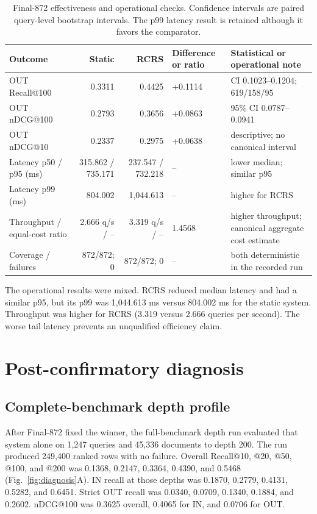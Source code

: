 \documentclass[final,5p,times,twocolumn]{elsarticle}
\newcommand{\RCRS}{RCRS}
\newenvironment{widejournal}{\begin{table}[!t]}{\end{table}}
\newenvironment{widejournal}{\begin{table}[!htbp]}{\end{table}}
\begin{document}
\begin{widejournal}
\caption{Final-872 effectiveness and operational checks. Confidence intervals
are paired query-level bootstrap intervals. The p99 latency result is retained
although it favors the comparator.}
\label{tab:final}
\centering
\scriptsize
\renewcommand{\arraystretch}{0.90}
\begin{tabularx}{\textwidth}{@{}P{2.4cm}r r P{1.5cm}Y@{}}
\toprule
Outcome & Static & \RCRS{} & Difference or ratio & Statistical or operational note \\
\midrule
OUT Recall@100 & 0.3311 & 0.4425 & +0.1114 &
CI 0.1023--0.1204; 619/158/95 \\
OUT nDCG@100 & 0.2793 & 0.3656 & +0.0863 &
95\% CI 0.0787--0.0941 \\
OUT nDCG@10 & 0.2337 & 0.2975 & +0.0638 &
descriptive; no canonical interval \\
Latency p50 / p95 (ms) & 315.862 / 735.171 & 237.547 / 732.218 & -- &
lower median; similar p95 \\
Latency p99 (ms) & 804.002 & 1,044.613 & -- & higher for \RCRS{} \\
Throughput / equal-cost ratio & 2.666 q/s / -- & 3.319 q/s / -- & 1.4568 &
higher throughput; canonical aggregate cost estimate \\
Coverage / failures & 872/872; 0 & 872/872; 0 & -- &
both deterministic in the recorded run \\
\bottomrule
\end{tabularx}
\end{widejournal}

The operational results were mixed. \RCRS{} reduced median latency and had a
similar p95, but its p99 was 1,044.613 ms versus 804.002 ms for the static
system. Throughput was higher for \RCRS{} (3.319 versus 2.666 queries per
second). The worse tail latency prevents an unqualified efficiency claim.

\section{Post-confirmatory diagnosis}

\subsection{Complete-benchmark depth profile}

After Final-872 fixed the winner, the full-benchmark depth run evaluated that
system alone on 1,247 queries and 45,336 documents to depth 200. The run
produced 249,400 ranked rows with no failure. Overall Recall@10, @20, @50,
@100, and @200 was 0.1368, 0.2147,
0.3364, 0.4390, and 0.5468 (Fig.~\ref{fig:diagnosis}A). IN recall at those
depths was 0.1870, 0.2779, 0.4131, 0.5282, and 0.6451. Strict OUT recall was
0.0340, 0.0709, 0.1340, 0.1884, and 0.2602. nDCG@100 was 0.3625 overall,
0.4065 for IN, and 0.0706 for OUT.
\end{document}

